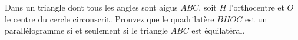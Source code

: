 Dans un triangle dont tous les angles sont aigus $ABC$, soit $H$
l'orthocentre et $O$ le centre du cercle circonscrit. Prouvez que le
quadrilatère $BHOC$ est un parallélogramme si et seulement si le triangle
$ABC$ est équilatéral.
